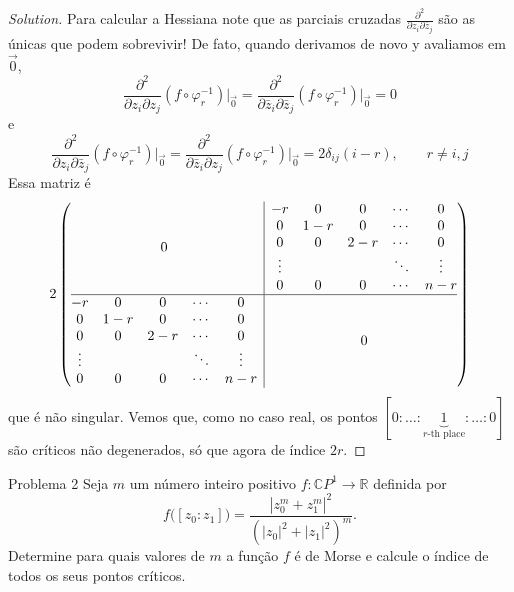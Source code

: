\begin{proof}[Solution]
Para calcular a Hessiana note que as parciais cruzadas \(\frac{\partial^2 }{\partial z_i\partial \overline{z}_j}\) são as únicas que podem sobrevivir! De fato, quando derivamos de novo y avaliamos em \(\vec{0}\),
\[\frac{\partial^2}{\partial z_i \partial z_j }(f \circ \varphi_r^{-1})\Big|_{\vec{0}}=\frac{\partial^2 }{\partial \bar{z}_i\partial \bar{z}_j}(f \circ \varphi_r^{-1})\Big|_{\vec{0}}=0\]
e
\[\frac{\partial^2 }{\partial z_i\partial \bar{z}_j}(f \circ \varphi_r^{-1})\Big|_{\vec{0}}=\frac{\partial^2 }{\partial \bar{z}_i\partial z_j}(f \circ \varphi_r^{-1})\Big|_{\vec{0}}=2\delta_{ij}(i-r), \qquad  r\neq i,j\]
Essa matriz é
\[2\left(\begin{array}{@{}c|c@{}}
0&\begin{matrix} -r & 0 &0 & \cdots &0\\
0 & 1-r & 0& \cdots & 0\\
0 & 0 & 2-r & \cdots & 0\\
\vdots & & &\ddots &\vdots \\
0 & 0 & 0 & \cdots & n-r\end{matrix}\\
\hline
\begin{matrix} -r & 0 &0 & \cdots &0\\
0 & 1-r & 0& \cdots & 0\\
0 & 0 & 2-r & \cdots & 0\\
\vdots & & &\ddots &\vdots \\
0 & 0 & 0 & \cdots & n-r\end{matrix}&0\end{array}\right)\]
que é não singular. Vemos que, como no caso real, os pontos \([0:\ldots:\underbrace{1}_{r\text{-th place} }:\ldots:0]\) são críticos não degenerados, só que agora de índice \(2r\).
\end{proof}

\begin{thing1}{Problema 2}\label{prob: 2}\leavevmode
Seja \(m\) um número inteiro positivo \(f:\mathbb{C}P^{1}\to \mathbb{R}\) definida por
\[f\Big([z_0:z_1]\Big)=\frac{|z_0^m+z_1^m|^2}{(|z_0|^2+|z_1|^2)^m}.\]
Determine para quais valores de \(m\) a função \(f\) é de Morse e calcule o índice de todos os seus pontos críticos.
\end{thing1}

